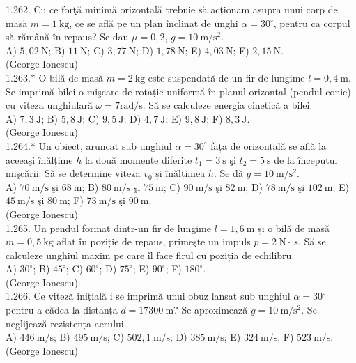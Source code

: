 1.262. Cu ce forţă minimă orizontală trebuie să acționăm asupra unui corp de masă $m=1 \mathrm{~kg}$, ce se află pe un plan înclinat de unghi $\alpha=30^{\circ}$, pentru ca corpul să rămână în repaus? Se dau $\mu=0,2$, $g=10 \mathrm{~m} / \mathrm{s}^{2}$.\\ A) $5,02 \mathrm{~N}$; B) $11 \mathrm{~N}$; C) $3,77 \mathrm{~N}$; D) $1,78 \mathrm{~N}$; E) $4,03 \mathrm{~N}$; F) $2,15 \mathrm{~N}$.\\ (George Ionescu)\\

1.263.* O bilă de masă $m=2 \mathrm{~kg}$ este suspendată de un fir de lungime $l=0,4 \mathrm{~m}$. Se imprimă bilei o mişcare de rotație uniformă în planul orizontal (pendul conic) cu viteza unghiulară $\omega=7 \mathrm{rad} / \mathrm{s}$. Să se calculeze energia cinetică a bilei.\\ A) $7,3 \mathrm{~J}$; B) $5,8 \mathrm{~J}$; C) $9,5 \mathrm{~J}$; D) $4,7 \mathrm{~J}$; E) $9,8 \mathrm{~J}$; F) $8,3 \mathrm{~J}$.\\ (George Ionescu)\\

1.264.* Un obiect, aruncat sub unghiul $\alpha=30^{\circ}$ fațā de orizontală se află la aceeaşi înălțime $h$ la două momente diferite $t_{1}=3 \mathrm{~s}$ şi $t_{2}=5 \mathrm{~s}$ de la începutul mişcării. Să se determine viteza $v_{0}$ și înălțimea $h$. Se dă $g=10 \mathrm{~m} / \mathrm{s}^{2}$.\\ A) $70 \mathrm{~m} / \mathrm{s}$ şi $68 \mathrm{~m}$; B) $80 \mathrm{~m} / \mathrm{s}$ şi $75 \mathrm{~m}$; C) $90 \mathrm{~m} / \mathrm{s}$ şi $82 \mathrm{~m}$; D) $78 \mathrm{~m} / \mathrm{s}$ şi $102 \mathrm{~m}$; E) $45 \mathrm{~m} / \mathrm{s}$ şi $80 \mathrm{~m}$; F) $73 \mathrm{~m} / \mathrm{s}$ şi $90 \mathrm{~m}$.\\ (George Ionescu)\\

1.265. Un pendul format dintr-un fir de lungime $l=1,6 \mathrm{~m}$ și o bilă de masă $m=0,5 \mathrm{~kg}$ aflat în poziție de repaus, primeşte un impuls $p=2 \mathrm{~N} \cdot \mathrm{~s}$. Să se calculeze unghiul maxim pe care îl face firul cu poziția de echilibru.\\ A) $30^{\circ}$; B) $45^{\circ}$; C) $60^{\circ}$; D) $75^{\circ}$; E) $90^{\circ}$; F) $180^{\circ}$.\\ (George Ionescu)\\

1.266. Ce viteză inițială i se imprimă unui obuz lansat sub unghiul $\alpha=30^{\circ}$ pentru a cădea la distanța $d=17300 \mathrm{~m}$? Se aproximează $g=10 \mathrm{~m} / \mathrm{s}^{2}$. Se neglijează rezistența aerului.\\ A) $446 \mathrm{~m} / \mathrm{s}$; B) $495 \mathrm{~m} / \mathrm{s}$; C) $502,1 \mathrm{~m} / \mathrm{s}$; D) $385 \mathrm{~m} / \mathrm{s}$; E) $324 \mathrm{~m} / \mathrm{s}$; F) $523 \mathrm{~m} / \mathrm{s}$.\\ (George Ionescu)\\

